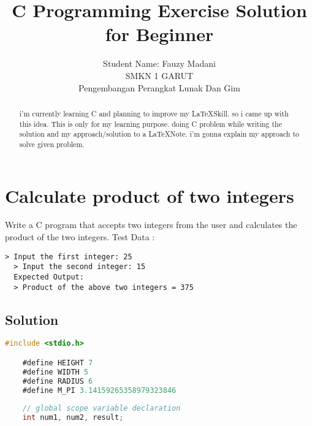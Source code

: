 \documentclass{article}
\title{C Programming Exercise Solution for Beginner}
\begin{document}
  \pagestyle{fancy}
  \fancyhf{}
  \fancyhead[LE]{\nouppercase{\rightmark\hfill\leftmark}}
  \fancyhead[RO]{\nouppercase{\leftmark\hfill\rightmark}}
  \fancyfoot[LE,RO]{\hfill\thepage\hfill}
  \author{
		Student Name: Fauzy Madani \\ 
		SMKN 1 GARUT \\
		Pengembangan Perangkat Lunak Dan Gim }

  \maketitle

  \tableofcontents

  \clearpage

  \begin{abstract}
  i'm currently learning C and planning to improve my \LaTeX Skill. so i came up with this idea. This is only for my learning purpose. doing C problem while writing the solution and
  my approach/solution to a \LaTeX Note. i'm gonna explain my approach to solve given problem.
  \end{abstract}

  \section{Calculate product of two integers}
  
  Write a C program that accepts two integers from the user and calculates the product of the two integers.
  Test Data :
  
  \begin{lstlisting}[style=plainstyle]
  > Input the first integer: 25
  > Input the second integer: 15
  Expected Output:
  > Product of the above two integers = 375
  \end{lstlisting}
  
  \subsection{Solution}
  \begin{lstlisting}[language=C, caption=Defining required Variable]
    #include <stdio.h>

    #define HEIGHT 7
    #define WIDTH 5
    #define RADIUS 6
    #define M_PI 3.14159265358979323846
    
    // global scope variable declaration
    int num1, num2, result;
  \end{lstlisting}
  
\end{document}
